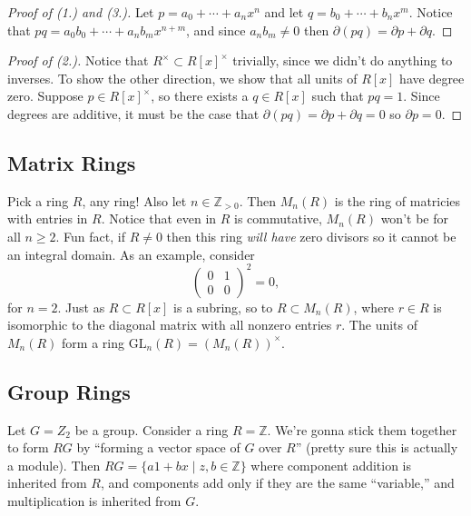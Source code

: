 \begin{proof}[Proof of (1.) and (3.)]
Let $p = a_0 + \cdots + a_nx^n$ and let $q = b_0 + \cdots + b_nx^m$. Notice that $pq = a_0b_0 + \cdots + a_nb_mx^{n+m}$, and since $a_nb_m \not= 0$ then $\partial(pq) = \partial p + \partial q$.
\end{proof}

\begin{proof}[Proof of (2.)]
Notice that $R^\times \subset R[x]^\times$ trivially, since we didn't do anything to inverses. To show the other direction, we show that all units of $R[x]$ have degree zero. Suppose $p \in R[x]^\times$, so there exists a $q \in R[x]$ such that $pq = 1$. Since degrees are additive, it must be the case that $\partial(pq) = \partial p + \partial q = 0$ so $\partial p = 0$.
\end{proof}

\subsection{Matrix Rings}

Pick a ring $R$, any ring! Also let $n \in \mathbb{Z}_{>0}$. Then $M_n(R)$ is the ring of matricies with entries in $R$. Notice that even in $R$ is commutative, $M_n(R)$ won't be for all $n \geq 2$. Fun fact, if $R \not= 0$ then this ring \emph{will have} zero divisors so it cannot be an integral domain. As an example, consider 
\[
\begin{pmatrix}
0 & 1  \\ 0 & 0
\end{pmatrix}^2 = 0,
\]
for $n = 2$. Just as $R \subset R[x]$ is a subring, so to $R \subset M_n(R)$, where $r \in R$ is isomorphic to the diagonal matrix with all nonzero entries $r$. The units of $M_n(R)$ form a ring $\mathrm{GL}_n(R) = \left(M_n(R)\right)^\times$.

\subsection{Group Rings}

\begin{example}
Let $G = Z_2$ be a group. Consider a ring $R = \mathbb{Z}$. We're gonna stick them together to form $RG$ by ``forming a vector space of $G$ over $R$'' (pretty sure this is actually a module). Then $RG = \{a1 + bx \mid z,b \in \mathbb{Z}\}$ where component addition is inherited from $R$, and components add only if they are the same ``variable,'' and multiplication is inherited from $G$.
\end{example}


